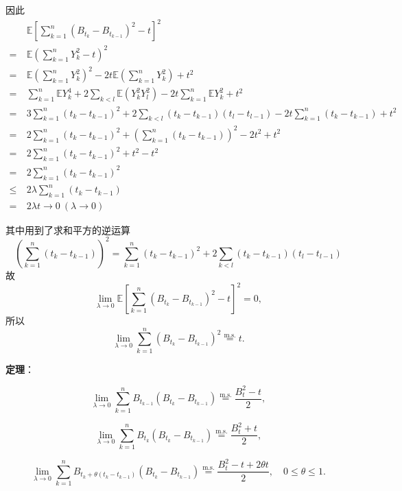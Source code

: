 \documentclass[openany]{ctexbook}
\theoremstyle{kaiti}
\theoremstyle{normal}
\begin{document}
因此
\begin{equation}
  \begin{aligned}
    &~\mathbb{E}\left[\sum_{k=1}^n(B_{t_k}-B_{t_{k-1}})^2-t\right]^2\\
    =&~\mathbb{E}\left(\sum_{k=1}^nY_k^2-t\right)^2\\
    =&~\mathbb{E}\left(\sum_{k=1}^nY_k^2\right)^2-2t\mathbb{E}\left(\sum_{k=1}^nY_k^2\right)+t^2\\
    =&~\sum_{k=1}^n\mathbb{E}Y_k^4+2\sum_{k<l}\mathbb{E}(Y_k^2Y_l^2)-2t\sum_{k=1}^n\mathbb{E}Y_k^2+t^2\\%
    =&~3\sum_{k=1}^n(t_k-t_{k-1})^2+2\sum_{k<l}(t_k-t_{k-1})(t_l-t_{l-1})-2t\sum_{k=1}^n(t_k-t_{k-1})+t^2\\%
    =&~2\sum_{k=1}^n(t_k-t_{k-1})^2+\left(\sum_{k=1}^n(t_k-t_{k-1})\right)^2-2t^2+t^2\\
    =&~2\sum_{k=1}^n(t_k-t_{k-1})^2+t^2-t^2\\
    =&~2\sum_{k=1}^n(t_k-t_{k-1})^2\\
    \leqslant&~2\lambda\sum_{k=1}^n(t_k-t_{k-1})\\
    =&~2\lambda t\to0~(\lambda\to0)
  \end{aligned}
\end{equation}

其中用到了求和平方的逆运算
\begin{equation}
  \left(\sum_{k=1}^n(t_k-t_{k-1})\right)^2=\sum_{k=1}^n(t_k-t_{k-1})^2+2\sum_{k<l}(t_k-t_{k-1})(t_l-t_{l-1})
\end{equation}
故
\begin{equation}
  \lim_{\lambda\to0}\mathbb{E}\left[\sum_{k=1}^n(B_{t_k}-B_{t_{k-1}})^2-t\right]^2=0,
\end{equation}
所以
\begin{equation}
  \lim_{\lambda\to0}\sum_{k=1}^n(B_{t_k}-B_{t_{k-1}})^2\overset{\text{m.s.}}{=}t.
\end{equation}

\textbf{定理}：

\begin{equation}
  \lim_{\lambda\to0}\sum_{k=1}^nB_{t_{k-1}}(B_{t_k}-B_{t_{k-1}})\overset{\text{m.s.}}{=}\frac{B_t^2-t}{2},
\end{equation}

\begin{equation}
  \lim_{\lambda\to0}\sum_{k=1}^nB_{t_{k}}(B_{t_k}-B_{t_{k-1}})\overset{\text{m.s.}}{=}\frac{B_t^2+t}{2},
\end{equation}

\begin{equation}
  \lim_{\lambda\to0}\sum_{k=1}^nB_{t_{k}+\theta(t_k-t_{k-1})}(B_{t_k}-B_{t_{k-1}})\overset{\text{m.s.}}{=}\frac{B_t^2-t+2\theta t}{2},\quad0\leqslant\theta\leqslant1.
\end{equation}
\end{document}

